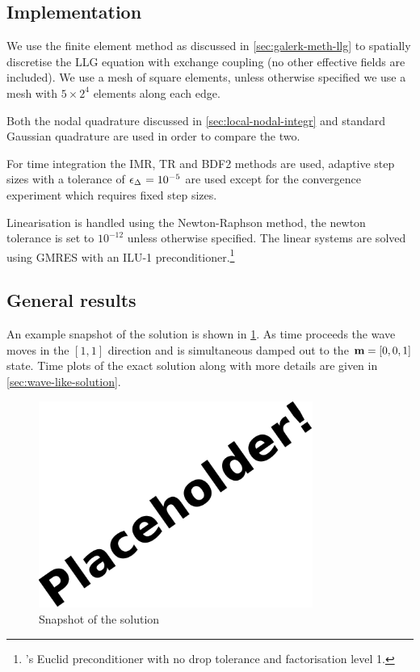 \subsection{Implementation}

We use the finite element method as discussed in \cref{sec:galerk-meth-llg} to spatially discretise the LLG equation with exchange coupling (no other effective fields are included).
We use a mesh of square elements, %
unless otherwise specified we use a mesh with $5 \times 2^4$ elements along each edge.

Both the nodal quadrature discussed in \cref{sec:local-nodal-integr} and standard Gaussian quadrature are used in order to compare the two.

For time integration the IMR, TR and BDF2 methods are used, adaptive step sizes with a tolerance of $\epsilon_{\Delta_{}} = 10^{-5}$ are used except for the convergence experiment which requires fixed step sizes. 

Linearisation is handled using the Newton-Raphson method, the newton tolerance is set to $10^{-12}$ unless otherwise specified.
The linear systems are solved using GMRES with an ILU-1 preconditioner.\footnote{\hypre's Euclid preconditioner \cite{hypre} with no drop tolerance and factorisation level 1.}


\subsection{General results}


An example snapshot of the solution is shown in \cref{fig:2d-wave-snapshot}.
As time proceeds the wave moves in the $[1,1]$ direction and is simultaneous damped out to the $\boldsymbol{\mathrm{m}} = [0,0,1]$ state.
Time plots of the exact solution along with more details are given in \cref{sec:wave-like-solution}.

\begin{figure}
  \centering
  \includegraphics[width=0.8\textwidth]{images/placeholder}
  \caption{Snapshot of the solution}
  \label{fig:2d-wave-snapshot}
\end{figure}


